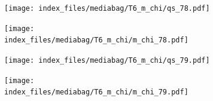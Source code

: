 \documentclass[
  11pt,
  letterpaper,
]{scrreprt}
\begin{document}
\begin{figure}

\begin{minipage}{0.50\linewidth}

\begin{figure}[H]

{\centering \texttt{[image: index\_files/mediabag/T6\_m\_chi/qs\_78.pdf]}

}


\end{figure}%

\end{minipage}%
%
\begin{minipage}{0.50\linewidth}

\begin{figure}[H]

{\centering \texttt{[image: index\_files/mediabag/T6\_m\_chi/m\_chi\_78.pdf]}

}


\end{figure}%

\end{minipage}%

\end{figure}%

\begin{figure}

\begin{minipage}{0.50\linewidth}

\begin{figure}[H]

{\centering \texttt{[image: index\_files/mediabag/T6\_m\_chi/qs\_79.pdf]}

}


\end{figure}%

\end{minipage}%
%
\begin{minipage}{0.50\linewidth}

\begin{figure}[H]

{\centering \texttt{[image: index\_files/mediabag/T6\_m\_chi/m\_chi\_79.pdf]}

}


\end{figure}%

\end{minipage}%

\end{figure}%
\end{document}
